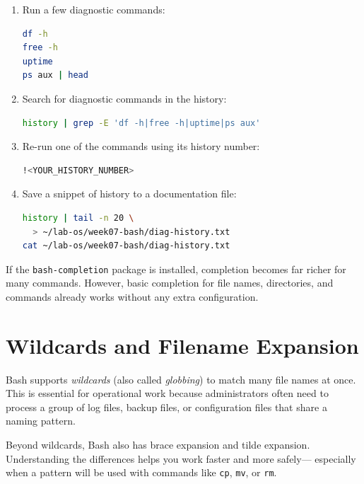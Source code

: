 \begin{enumerate}
  \item Run a few diagnostic commands:
\begin{lstlisting}[language=bash, caption={Running diagnostic commands}]
df -h
free -h
uptime
ps aux | head
\end{lstlisting}

  \item Search for diagnostic commands in the history:
\begin{lstlisting}[language=bash, caption={Searching commands from history}]
history | grep -E 'df -h|free -h|uptime|ps aux'
\end{lstlisting}

  \item Re-run one of the commands using its history number:
\begin{lstlisting}[language=bash, caption={Re-running a command from history}]
!<YOUR_HISTORY_NUMBER>
\end{lstlisting}

  \item Save a snippet of history to a documentation file:
\begin{lstlisting}[language=bash, caption={Saving history to a file}]
history | tail -n 20 \
  > ~/lab-os/week07-bash/diag-history.txt
cat ~/lab-os/week07-bash/diag-history.txt
\end{lstlisting}
\end{enumerate}

\begin{tipbox}
If the \texttt{bash-completion} package is installed, completion becomes far
richer for many commands. However, basic completion for file names,
directories, and commands already works without any extra configuration.
\end{tipbox}

\section{Wildcards and Filename Expansion}
\label{sec:wildcards-expansion}

Bash supports \textit{wildcards} (also called \textit{globbing}) to match
many file names at once. This is essential for operational work because
administrators often need to process a group of log files, backup files, or
configuration files that share a naming pattern.

Beyond wildcards, Bash also has brace expansion and tilde expansion.
Understanding the differences helps you work faster and more safely---
especially when a pattern will be used with commands like \texttt{cp},
\texttt{mv}, or \texttt{rm}.

